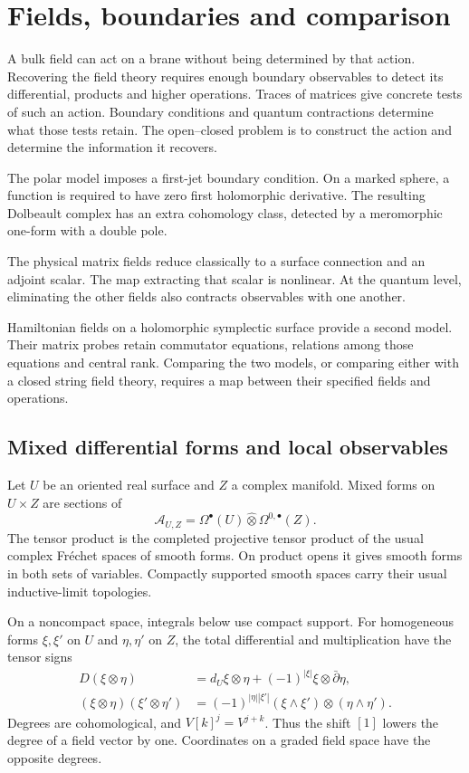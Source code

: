 \chapter{Fields, boundaries and comparison}
\label{mht:ch:fields-boundaries}

A bulk field can act on a brane without being determined by that
action. Recovering the field theory requires enough boundary
observables to detect its differential, products and higher operations.
Traces of matrices give concrete tests of such an action. Boundary
conditions and quantum contractions determine what those tests retain.
The open--closed problem is to construct the action and determine the
information it recovers.

The polar model imposes a first-jet boundary condition. On a marked
sphere, a function is required to have zero first holomorphic
derivative. The resulting Dolbeault complex has an extra cohomology
class, detected by a meromorphic one-form with a double pole.

The physical matrix fields reduce classically to a surface connection
and an adjoint scalar. The map extracting that scalar is nonlinear. At the
quantum level, eliminating the other fields also contracts observables
with one another.

Hamiltonian fields on a holomorphic symplectic surface provide a second
model. Their matrix probes retain commutator equations, relations among
those equations and central rank. Comparing the two models, or comparing
either with a closed string field theory, requires a map between their
specified fields and operations.

\section{Mixed differential forms and local observables}

Let $U$ be an oriented real surface and $Z$ a complex manifold. Mixed
forms on $U\times Z$ are sections of
\[
 \mathcal A_{U,Z}
   =\Omega^\bullet(U)\widehat\otimes\Omega^{0,\bullet}(Z).
\]
The tensor product is the completed projective tensor product of the
usual complex Fréchet spaces of smooth forms. On product opens it gives
smooth forms in both sets of variables. Compactly supported smooth
spaces carry their usual inductive-limit topologies.

On a noncompact space, integrals below use compact support.
For homogeneous forms $\xi,\xi'$ on $U$ and $\eta,\eta'$ on $Z$,
the total differential and multiplication have the tensor signs
\begin{align}
 D(\xi\otimes\eta)
   &=d_U\xi\otimes\eta+(-1)^{|\xi|}\xi\otimes\bar\partial\eta,
       \label{mht:eq:mixed-differential}\\
 (\xi\otimes\eta)(\xi'\otimes\eta')
   &=(-1)^{|\eta||\xi'|}(\xi\wedge\xi')\otimes(\eta\wedge\eta').
       \label{mht:eq:mixed-product}
\end{align}
Degrees are cohomological, and $V[k]^j=V^{j+k}$. Thus the shift
$[1]$ lowers the degree of a field vector by one. Coordinates on a
graded field space have the opposite degrees.


